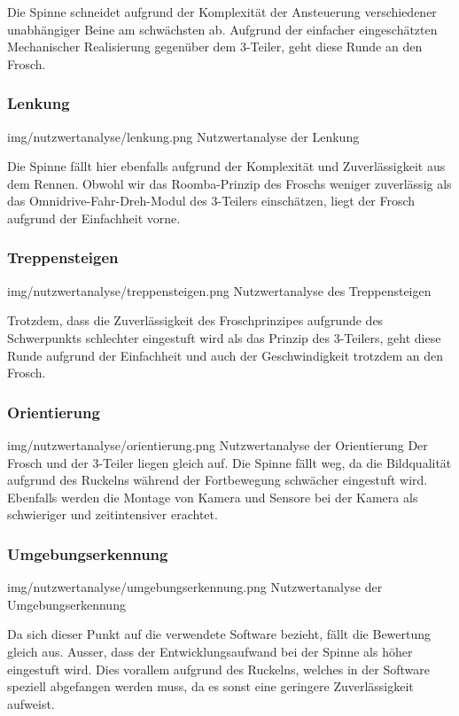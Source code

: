 Die Spinne schneidet aufgrund der Komplexität der Ansteuerung verschiedener unabhängiger Beine am schwächsten ab. Aufgrund der einfacher eingeschätzten Mechanischer Realisierung gegenüber dem 3-Teiler, geht diese Runde an den Frosch.
   
\subsubsection{Lenkung}
\image
   {img/nutzwertanalyse/lenkung.png}
   {Nutzwertanalyse der Lenkung}
   
Die Spinne fällt hier ebenfalls aufgrund der Komplexität und Zuverlässigkeit aus dem Rennen. Obwohl wir das Roomba-Prinzip des Froschs weniger zuverlässig als das Omnidrive-Fahr-Dreh-Modul des 3-Teilers einschätzen, liegt der Frosch aufgrund der Einfachheit vorne.
   
\subsubsection{Treppensteigen}
\image
   {img/nutzwertanalyse/treppensteigen.png}
   {Nutzwertanalyse des Treppensteigen}
   
Trotzdem, dass die Zuverlässigkeit des Froschprinzipes aufgrunde des Schwerpunkts schlechter eingestuft wird als das Prinzip des 3-Teilers, geht diese Runde aufgrund der Einfachheit und auch der Geschwindigkeit trotzdem an den Frosch.
   
\subsubsection{Orientierung}
\image
   {img/nutzwertanalyse/orientierung.png}
   {Nutzwertanalyse der Orientierung}
   Der Frosch und der 3-Teiler liegen gleich auf. Die Spinne fällt weg, da die Bildqualität aufgrund des Ruckelns während der Fortbewegung schwächer eingestuft wird. Ebenfalls werden die Montage von Kamera und Sensore bei der Kamera als schwieriger und zeitintensiver erachtet.
   
\subsubsection{Umgebungserkennung}
\image
   {img/nutzwertanalyse/umgebungserkennung.png}
   {Nutzwertanalyse der Umgebungserkennung}
   
Da sich dieser Punkt auf die verwendete Software bezieht, fällt die Bewertung gleich aus. Ausser, dass der Entwicklungsaufwand bei der Spinne als höher eingestuft wird. Dies vorallem aufgrund des Ruckelns, welches in der Software speziell abgefangen werden muss, da es sonst eine geringere Zuverlässigkeit aufweist. 
   
